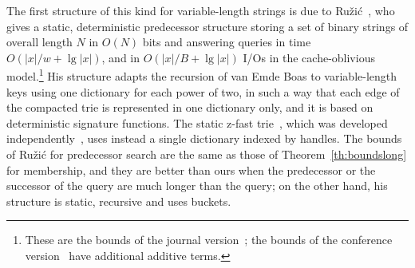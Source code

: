 \documentclass[a4paper]{article}
\newcommand{\?}{\mskip1.5mu}
\begin{document}
The first structure of this kind for variable-length strings is due to Ru\v{z}i\'c~\cite{Ruzic2007Making,Ruzic2009Making}, 
who gives a static, deterministic predecessor structure storing a set of binary strings of overall length $N$ in $O(N)$ bits and answering queries in time $O(|x|/w+\lg|x|)$, and 
in $O(|x|/B+\lg|x|)$ I/Os in the cache-oblivious model.\footnote{These are the bounds of the journal version~\cite{Ruzic2009Making};
the bounds of the conference version~\cite{Ruzic2007Making} have additional additive terms.} 
His structure adapts the recursion of van Emde Boas to variable-length keys using one dictionary for each power of two, in such a way 
that each edge of the compacted trie is represented in one dictionary only, and it is based on deterministic signature functions. 
The static z-fast trie~\cite{BBPMMPH,Belazzougui2010Fast}, which was developed independently~\cite{Navarro2020Predecessor}, uses instead a single dictionary indexed by handles.
The bounds of Ru\v{z}i\'c for predecessor search are the same as those of Theorem~\ref{th:boundslong} for membership, and they 
are better than ours when the predecessor or the successor of the query are much longer than the query; on the other hand, his structure is 
static, recursive and uses buckets.
\end{document}
